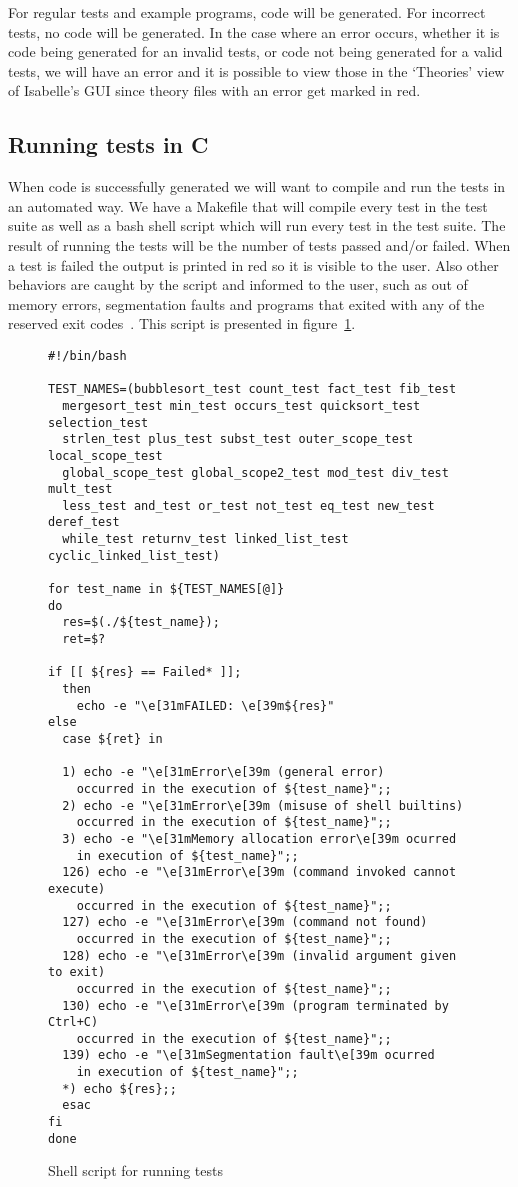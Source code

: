For regular tests and example programs, code will be generated.
For incorrect tests, no code will be generated.
In the case where an error occurs, whether it is code being generated for an invalid tests, or code not being generated for a valid tests, we will have an error and it is possible to view those in the `Theories' view of Isabelle's GUI since theory files with an error get marked in red.

\subsection{Running tests in C}

When code is successfully generated we will want to compile and run the tests in an automated way.
We have a Makefile that will compile every test in the test suite as well as a bash shell script which will run every test in the test suite.
The result of running the tests will be the number of tests passed and/or failed.
When a test is failed the output is printed in red so it is visible to the user.
Also other behaviors are caught by the script and informed to the user, such as out of memory errors, segmentation faults and programs that exited with any of the reserved exit codes~\parencite{bash-scripting}.
This script is presented in figure~\ref{fig:bash_script}.

\begin{figure}
\begin{lstlisting}
#!/bin/bash

TEST_NAMES=(bubblesort_test count_test fact_test fib_test
  mergesort_test min_test occurs_test quicksort_test selection_test
  strlen_test plus_test subst_test outer_scope_test local_scope_test
  global_scope_test global_scope2_test mod_test div_test mult_test
  less_test and_test or_test not_test eq_test new_test deref_test
  while_test returnv_test linked_list_test cyclic_linked_list_test)

for test_name in ${TEST_NAMES[@]}
do
  res=$(./${test_name});
  ret=$?

if [[ ${res} == Failed* ]];
  then
    echo -e "\e[31mFAILED: \e[39m${res}"
else
  case ${ret} in

  1) echo -e "\e[31mError\e[39m (general error)
    occurred in the execution of ${test_name}";;
  2) echo -e "\e[31mError\e[39m (misuse of shell builtins)
    occurred in the execution of ${test_name}";;
  3) echo -e "\e[31mMemory allocation error\e[39m ocurred
    in execution of ${test_name}";;
  126) echo -e "\e[31mError\e[39m (command invoked cannot execute)
    occurred in the execution of ${test_name}";;
  127) echo -e "\e[31mError\e[39m (command not found)
    occurred in the execution of ${test_name}";;
  128) echo -e "\e[31mError\e[39m (invalid argument given to exit)
    occurred in the execution of ${test_name}";;
  130) echo -e "\e[31mError\e[39m (program terminated by Ctrl+C)
    occurred in the execution of ${test_name}";;
  139) echo -e "\e[31mSegmentation fault\e[39m ocurred
    in execution of ${test_name}";;
  *) echo ${res};;
  esac
fi
done
\end{lstlisting}

\caption{Shell script for running tests}
\label{fig:bash_script}
\end{figure}
